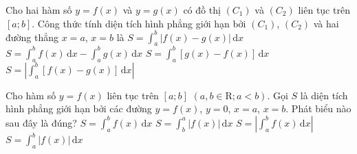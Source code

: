 \begin{ex}%
	Cho hai hàm  số $y = f(x)$ và $y = g(x)$ có đồ thị $(C_1)$ và $(C_2)$ liên tục trên $[a;b]$. Công thức tính diện tích hình phẳng giới hạn bởi $(C_1)$, $(C_2)$ và hai đường thẳng $x=a$, $x=b$ là
	\choice 
		{\True $S =  \displaystyle\int_{a}^{b} |f(x)-g(x)|\mathrm{\,d}x$}
		{$S = \displaystyle\int_{a}^{b} f(x)\mathrm{\,d}x -  \displaystyle\int_{a}^{b} g(x)\mathrm{\,d}x$}
		{$S  = \displaystyle\int_{a}^{b} [g(x)-f(x)]\mathrm{\,d}x$}
		{$S = \left|  \displaystyle\int_{a}^{b} [f(x)-g(x)]\mathrm{\,d}x \right|$}
\end{ex}

\begin{ex}%
	Cho hàm số $y=f(x)$ liên tục trên $\left[a;b \right]$ $(a,b\in \mathrm{R}; a<b)$. Gọi $S$ là diện tích hình phẳng giới hạn bởi các đường $y=f(x)$, $y=0$,  $x=a$, $x=b$. Phát biểu nào sau đây là đúng?
	\choice 
		{$S=\displaystyle\int_a^b  f(x)\mathrm{\,d}x$}
		{$S=\displaystyle\int_b^a  \left| f(x) \right|\mathrm{\,d}x$}
		{$S=\left| \displaystyle\int_a^b  f(x)\mathrm{\,d}x \right|$}
		{\True $S=\displaystyle\int_a^b \left|  f(x) \right|\mathrm{\,d}x$}
\end{ex}

